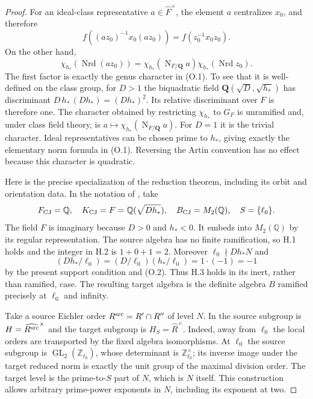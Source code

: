 \documentclass[11pt]{article}
\theoremstyle{definition}
\theoremstyle{remark}
\newcommand{\Q}{\mathbb Q}
\newcommand{\Z}{\mathbb Z}
\begin{document}
\begin{proof}
For an ideal-class representative $a\in\widehat F^{\times}$,
the element $a$ centralizes $x_0$, and therefore
\[
 f((az_0)^{-1}x_0(az_0))=f(z_0^{-1}x_0z_0).
\]
On the other hand,
\[
 \chi_{h_*}(\operatorname{Nrd}(az_0))
 =\chi_{h_*}(\operatorname{N}_{F/\mathbf Q}a)
                    \chi_{h_*}(\operatorname{Nrd}z_0).
\]
The first factor is exactly the genus character in (O.1).
To see that it is well-defined on the class group, for $D>1$
the biquadratic field $\mathbf Q(\sqrt D,\sqrt{h_*})$ has
discriminant $D\,h_*\,(Dh_*)=(Dh_*)^2$. Its relative
discriminant over $F$ is therefore one. The character obtained
by restricting $\chi_{h_*}$ to $G_F$ is unramified and, under
class field theory, is $a\mapsto
\chi_{h_*}(\operatorname{N}_{F/\mathbf Q}a)$. For $D=1$ it
is the trivial character. Ideal representatives can be chosen
prime to $h_*$, giving exactly the elementary norm formula in
(O.1). Reversing the Artin convention has no effect because this
character is quadratic.

Here is the precise specialization of the reduction theorem, including
its orbit and orientation data. In the notation of
\cite[\S\S3.1--3.3]{cornutjetchev}, take
\[
 F_{\rm CJ}=\Q,\quad K_{\rm CJ}=F=\Q(\sqrt{Dh_*}),\quad
 B_{\rm CJ}=M_2(\Q),\quad S=\{\ell_0\}.
\]
The field $F$ is imaginary because $D>0$ and $h_*<0$.
It embeds into $M_2(\Q)$ by its regular representation. The source
algebra has no finite ramification, so H.1 holds and the integer
in H.2 is $1+0+1=2$. Moreover $\ell_0\nmid Dh_*N$ and
\[
  (Dh_*/\ell_0)=(D/\ell_0)(h_*/\ell_0)=1\cdot(-1)=-1
\]
by the present support condition and (O.2). Thus H.3 holds in its
inert, rather than ramified, case. The resulting target algebra is
the definite algebra $B$ ramified precisely at $\ell_0$ and infinity.

Take a source Eichler order $R^{\rm src}=R'\cap R''$ of level $N$.
In \cite[\S3.2]{cornutjetchev} the source subgroup is
$H=\widehat{R^{\rm src}}^{\times}$ and the target subgroup is
$H_S=\widehat R^{\times}$. Indeed, away from $\ell_0$ the local
orders are transported by the fixed algebra isomorphisms. At $\ell_0$
the source subgroup is $\operatorname{GL}_2(\Z_{\ell_0})$,
whose determinant is $\Z_{\ell_0}^{\times}$; its inverse image
under the target reduced norm is exactly the unit group of the
maximal division order. The target level is the prime-to-$S$ part
of $N$, which is $N$ itself. This construction allows arbitrary
prime-power exponents in $N$, including its exponent at two.


\end{proof}
\end{document}
